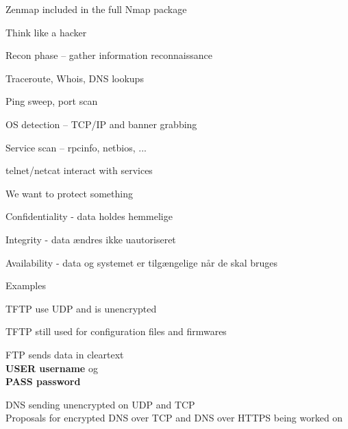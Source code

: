 \documentclass[Screen16to9,17pt]{foils}
\begin{document}

\centerline{Zenmap included in the full Nmap package }



\begin{list1}
\item Think like a hacker
\item Recon phase -- gather information reconnaissance
\begin{list2}
\item Traceroute, Whois, DNS lookups
\item Ping sweep, port scan
\item OS detection -- TCP/IP and banner grabbing
\item Service scan -- rpcinfo, netbios, ...
\item telnet/netcat interact with services
\end{list2}
\end{list1}







\begin{list1}
\item We want to protect something
\item Confidentiality - data holdes hemmelige
\item Integrity - data ændres ikke uautoriseret
\item Availability - data og systemet er tilgængelige når de skal bruges
\end{list1}


Examples
\begin{list2}
\item TFTP use UDP and is unencrypted
\item TFTP still used for configuration files and firmwares
\item FTP sends data in cleartext\\
{\bfseries USER username} og \\
{\bfseries PASS password}
\item DNS sending unencrypted on UDP and TCP\\
Proposals for encrypted DNS over TCP and DNS over HTTPS being worked on
\end{list2}
\end{document}
